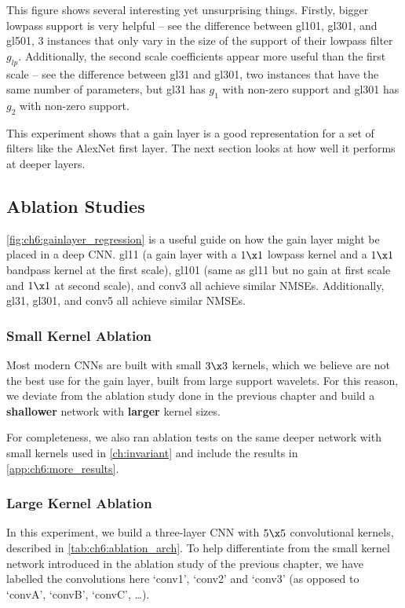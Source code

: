 This figure shows several interesting yet unsurprising things. Firstly,
bigger lowpass support is very helpful -- see the difference between gl101,
gl301, and gl501, 3 instances that only vary in the size of the support of their
lowpass filter $g_{lp}$. Additionally, the second scale coefficients appear more
useful than the first scale -- see the difference between gl31 and gl301, two
instances that have the same number of parameters, but gl31 has $g_1$ with
non-zero support and gl301 has $g_2$ with non-zero support.

This experiment shows that a gain layer is a good representation for a set of
filters like the AlexNet first layer. The next section looks at how well it
performs at deeper layers.

\subsection{Ablation Studies}\label{sec:ch6:ablation}
\autoref{fig:ch6:gainlayer_regression} is a useful guide on how the gain layer
might be placed in a deep CNN. gl11 (a gain layer with a $1\x1$ lowpass kernel
and a $1\x1$ bandpass kernel at the first scale), gl101 (same as gl11 but no
gain at first scale and $1\x 1$ at second scale), and conv3 all achieve similar
NMSEs. Additionally, gl31, gl301, and conv5 all achieve similar NMSEs.

\subsubsection{Small Kernel Ablation}
Most modern CNNs are built with small $3\x 3$ kernels, which we believe are not the best
use for the gain layer, built from large support wavelets. For this reason, we
deviate from the ablation study done in the previous chapter and build a
\textbf{shallower} network with \textbf{larger} kernel sizes.

For completeness, we also ran ablation tests on the same deeper network
with small kernels used in \autoref{ch:invariant} and include the results in
\autoref{app:ch6:more_results}.

\renewcommand{\_}{\textscale{.6}{\textunderscore}}
\subsubsection{Large Kernel Ablation}


In this experiment, we build a three-layer CNN with $5\x 5$ convolutional
kernels, described in \autoref{tab:ch6:ablation_arch}.  To help differentiate
from the small kernel network introduced in the ablation study of the previous
chapter, we have labelled the convolutions here `conv1', `conv2' and `conv3' (as
opposed to `convA', `convB', `convC', \ldots).

